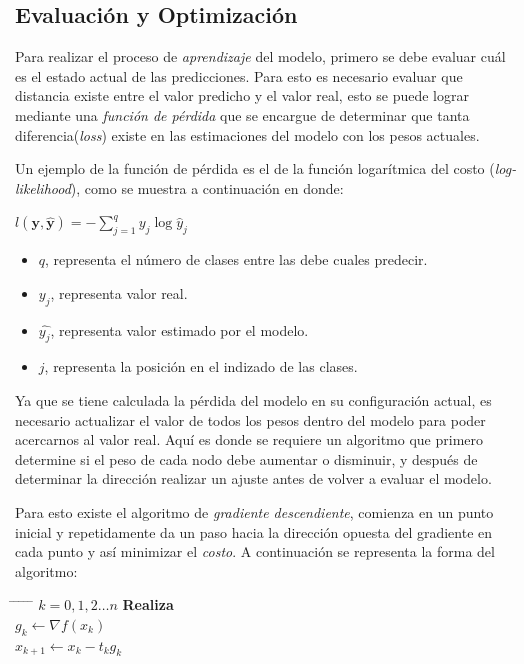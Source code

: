 \subsection{Evaluación y Optimización}
Para realizar el proceso de \emph{aprendizaje} del modelo, primero se debe evaluar cuál es el estado actual de las predicciones. Para esto es necesario evaluar que distancia existe entre el valor predicho y el valor real, esto se puede lograr mediante una \emph{función de pérdida} que se encargue de determinar que tanta diferencia(\emph{loss}) existe en las estimaciones del modelo con los pesos actuales.

Un ejemplo de la función de pérdida es el de la función logarítmica del costo (\emph{log-likelihood}), como se muestra a continuación en donde:

$l(\mathbf{y}, \hat{\mathbf{y}}) = - \sum_{j=1}^q y_j \log \hat{y}_j$ 

\begin{itemize}
    \item $q$, representa el número de clases entre las debe cuales predecir.
    \item $y_j$, representa valor real.
    \item $\hat{y_j}$, representa valor estimado por el modelo.
    \item $j$, representa la posición en el indizado de las clases.
\end{itemize}

Ya que se tiene calculada la pérdida del modelo en su configuración actual, es necesario actualizar el valor de todos los pesos dentro del modelo para poder acercarnos al valor real. Aquí es donde se requiere un algoritmo que primero determine si el peso de cada nodo debe aumentar o disminuir, y después de determinar la dirección realizar un ajuste antes de volver a evaluar el modelo.

Para esto existe el algoritmo de \emph{gradiente descendiente}, comienza en un punto inicial y repetidamente da un paso hacia la dirección opuesta del gradiente en cada punto y así minimizar el \emph{costo}. A continuación se representa la forma del algoritmo:

\begin{tabbing}
    \hspace*{1.5in} \= \hspace*{0.7in} \= \hspace*{.25in} \= \hspace*{.25in} \= \hspace*{.25in} \=\kill
     $k=0,1,2 \dots n$ {\bf Realiza } \\
    \>\> $g_k \leftarrow \nabla f(x_k)$ \\
    \>\> $x_{k+1} \leftarrow x_k - t_k g_k$ \\
     \\
\end{tabbing}

